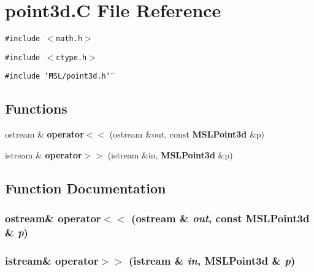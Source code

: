 \section{point3d.C File Reference}
\label{point3d_8C}
{\tt \#include $<$math.h$>$}\par
{\tt \#include $<$ctype.h$>$}\par
{\tt \#include \char`\"{}MSL/point3d.h\char`\"{}}\par
\subsection*{Functions}
\begin{CompactItemize}
\item 
ostream \& {\bf operator$<$$<$} (ostream \&out, const {\bf MSLPoint3d} \&p)
\item 
istream \& {\bf operator$>$$>$} (istream \&in, {\bf MSLPoint3d} \&p)
\end{CompactItemize}


\subsection{Function Documentation}
\subsubsection{\setlength{\rightskip}{0pt plus 5cm}ostream\& operator$<$$<$ (ostream \& {\em out}, const {\bf MSLPoint3d} \& {\em p})}\label{point3d_8C_a1}


\subsubsection{\setlength{\rightskip}{0pt plus 5cm}istream\& operator$>$$>$ (istream \& {\em in}, {\bf MSLPoint3d} \& {\em p})}\label{point3d_8C_a2}


